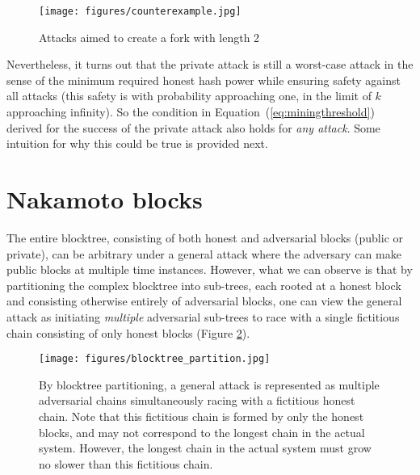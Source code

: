 \documentclass{article}
\newcommand{\pramod}[1]{{\color{red}
\footnotesize[Pramod: #1] }}
\newcommand{\xw}[1]{{\color{green}
\footnotesize[Xuechao: #1] }}
\begin{document}
\begin{figure}
    \centering
    \texttt{[image: figures/counterexample.jpg]}
    \caption{Attacks aimed to create a fork with length 2}
    \label{fig:counterexample}
\end{figure}


Nevertheless, it turns out that the private attack is still a worst-case attack in the sense of the  minimum required honest hash power while ensuring safety against all attacks (this safety is with probability approaching one, in the  limit of $k$ approaching infinity). So the condition in Equation~(\ref{eq:miningthreshold}) derived for the success of the private attack also holds for {\em any attack}. Some  intuition for why this could be true is provided next.  %


\section*{Nakamoto blocks}

The entire blocktree, consisting of both honest and adversarial blocks (public or private), can be arbitrary under a general attack where the adversary can make public blocks at multiple time instances. However, what we can observe is that by partitioning the complex blocktree into sub-trees, each rooted at a honest block and consisting otherwise entirely of adversarial blocks, one can view the general attack as initiating {\em multiple} adversarial sub-trees to race with a single fictitious chain consisting of only honest blocks (Figure \ref{fig:blocktree_partition}). 


\begin{figure}
     \centering
     \texttt{[image: figures/blocktree\_partition.jpg]}
   \caption{By blocktree partitioning, a general attack is represented as multiple adversarial chains simultaneously racing with a fictitious honest chain. Note that this fictitious chain is formed by only the honest blocks, and may not correspond to the longest chain in the actual system. However, the longest chain in the actual system must grow no slower than this fictitious chain. }
   \label{fig:blocktree_partition}
\end{figure}
\end{document}
